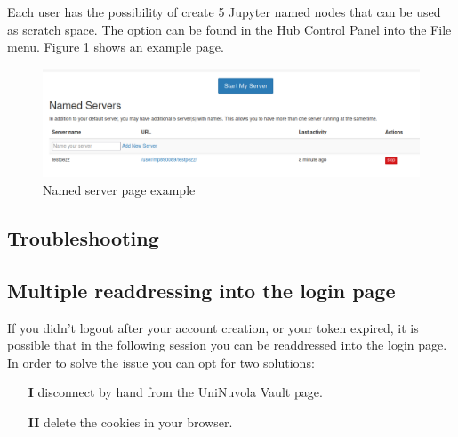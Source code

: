 Each user has the possibility of create 5 Jupyter  named nodes that can be used as scratch space. The option can be
found in the Hub Control Panel into the File menu. Figure \ref{fig:uninuvola_multi} shows an example page.

\begin{figure}[!ht]
    \centering
    \includegraphics[width=0.90\linewidth]{img/multiserver.png}
    \caption{Named server page example}
    \label{fig:uninuvola_multi}
\end{figure}


\subsection{Troubleshooting}
\subsection{Multiple readdressing into the login page}
If you didn't logout after your account creation, or your token expired, it is possible that in the following session
you can be readdressed into the login page.  In order to solve the issue you can opt for two solutions:
\begin{itemize}
    \item[\textbf{I}] disconnect by hand from the UniNuvola Vault page.
    \item[\textbf{II}] delete the cookies in your browser.
\end{itemize}

